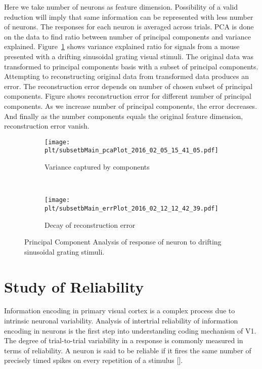 \documentclass[MTech]{iitmdiss}
\newcommand{\plt}{thesis_plots}
\begin{document}
Here we take number of neurons as feature dimension. Possibility of a valid reduction will imply that same information can be represented with less number of neurons. The responses for each neuron is averaged across trials.  PCA is done on the data to find ratio between number of principal components and variance explained. Figure~\ref{img:pca} shows variance explained ratio for signals from a mouse presented with a drifting sinusoidal grating visual stimuli. The original data was transformed to principal components basis with a subset of principal components. Attempting to reconstructing original data from transformed data produces an error. The reconstruction error depends on number of chosen subset of principal components. Figure shows reconstruction error for different number of principal components. As we increase number of principal components, the error decreases. And finally as the number components equals the original feature dimension, reconstruction error vanish.
\begin{figure}
    \centering
    \begin{subfigure}[b]{.48\textwidth}
        \centering
        \texttt{[image: \\plt/subsetbMain\_pcaPlot\_2016\_02\_05\_15\_41\_05.pdf]}
        \caption{Variance captured by components}
        \label{img:pca}
    \end{subfigure}
    ~
    \begin{subfigure}[b]{.48\textwidth}
        \centering
        \texttt{[image: \\plt/subsetbMain\_errPlot\_2016\_02\_12\_12\_42\_39.pdf]}
        \caption{Decay of reconstruction error}
        \label{img:reconstruction}
    \end{subfigure}
    \caption{Principal Component Analysis of response of neuron to drifting sinusoidal grating stimuli.}
\end{figure}
\section{Study of Reliability} %
\label{sec:study_of_reliability}
Information encoding in primary visual cortex is a complex process due to intrinsic neuronal variability. Analysis of intertrial reliability of information encoding in neurons is the first step into understanding coding mechanism of V1. The degree of trial-to-trial variability in a response is commonly measured in terms of reliability. A neuron is said to be reliable if it fires the same number of precisely timed spikes on every repetition of a stimulus [\cite{tiesinga2008regulation}].
\end{document}
